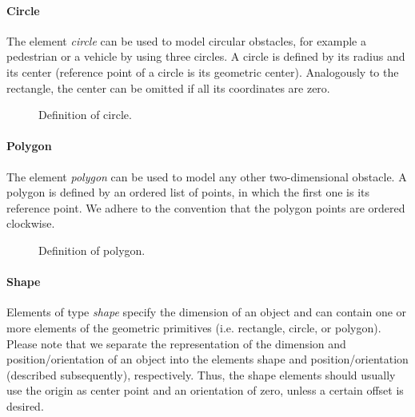 \paragraph{Circle}
The element \textit{circle} can be used to model circular obstacles, for example a pedestrian or a vehicle by using three circles.
A circle is defined by its radius and its center (reference point of a circle is its geometric center).
Analogously to the rectangle, the center can be omitted if all its coordinates are zero.
\begin{figure}[!htpb]
	\small
	\caption{Definition of circle.}
	\label{fig:auxiliary}
\end{figure}

\paragraph{Polygon}
The element \textit{polygon} can be used to model any other two-dimensional obstacle.
A polygon is defined by an ordered list of points, in which the first one is its reference point.
We adhere to the convention that the polygon points are ordered clockwise.
\begin{figure}[!htpb]
	\small
	\caption{Definition of polygon.}
	\label{fig:auxiliary}
\end{figure}



\paragraph{Shape}
Elements of type \emph{shape} specify the dimension of an object and can contain one or more elements of the geometric primitives (i.e. rectangle, circle, or polygon). Please note that we separate the representation of the dimension and position/orientation of an object into the elements shape and position/orientation (described subsequently), respectively. Thus, the shape elements should usually use the origin as center point and an orientation of zero, unless a certain offset is desired.


